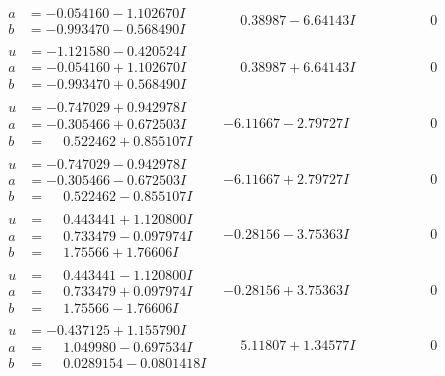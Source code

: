\documentclass[1p]{elsarticle_modified}
\theoremstyle{definition}
\begin{document}
$$\begin{array}{c|c|c}
\begin{aligned}
a &= -0.054160 - 1.102670 I \\
b &= -0.993470 - 0.568490 I\end{aligned}
 & \phantom{-}0.38987 - 6.64143 I & \phantom{-0.000000 } 0 \\ \hline\begin{aligned}
u &= -1.121580 - 0.420524 I \\
a &= -0.054160 + 1.102670 I \\
b &= -0.993470 + 0.568490 I\end{aligned}
 & \phantom{-}0.38987 + 6.64143 I & \phantom{-0.000000 } 0 \\ \hline\begin{aligned}
u &= -0.747029 + 0.942978 I \\
a &= -0.305466 + 0.672503 I \\
b &= \phantom{-}0.522462 + 0.855107 I\end{aligned}
 & -6.11667 - 2.79727 I & \phantom{-0.000000 } 0 \\ \hline\begin{aligned}
u &= -0.747029 - 0.942978 I \\
a &= -0.305466 - 0.672503 I \\
b &= \phantom{-}0.522462 - 0.855107 I\end{aligned}
 & -6.11667 + 2.79727 I & \phantom{-0.000000 } 0 \\ \hline\begin{aligned}
u &= \phantom{-}0.443441 + 1.120800 I \\
a &= \phantom{-}0.733479 - 0.097974 I \\
b &= \phantom{-}1.75566 + 1.76606 I\end{aligned}
 & -0.28156 - 3.75363 I & \phantom{-0.000000 } 0 \\ \hline\begin{aligned}
u &= \phantom{-}0.443441 - 1.120800 I \\
a &= \phantom{-}0.733479 + 0.097974 I \\
b &= \phantom{-}1.75566 - 1.76606 I\end{aligned}
 & -0.28156 + 3.75363 I & \phantom{-0.000000 } 0 \\ \hline\begin{aligned}
u &= -0.437125 + 1.155790 I \\
a &= \phantom{-}1.049980 - 0.697534 I \\
b &= \phantom{-}0.0289154 - 0.0801418 I\end{aligned}
 & \phantom{-}5.11807 + 1.34577 I & \phantom{-0.000000 } 0 \\ \hline\begin{aligned}

\end{aligned}
\end{array}$$
\end{document}
